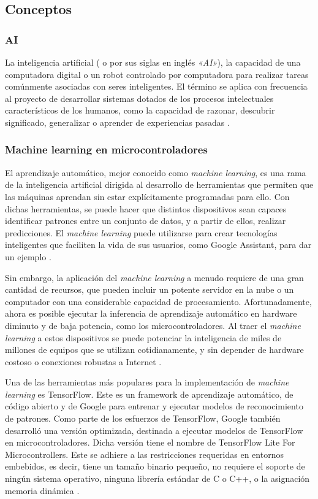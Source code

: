 \subsection{Conceptos}

\subsubsection{AI}

La inteligencia artificial ( o por sus siglas en inglés \textit{«AI»}), la capacidad de una computadora digital o un robot controlado por computadora para realizar tareas comúnmente asociadas con seres inteligentes. El término se aplica con frecuencia al proyecto de desarrollar sistemas dotados de los procesos intelectuales característicos de los humanos, como la capacidad de razonar, descubrir significado, generalizar o aprender de experiencias pasadas \cite{AI}.

\subsubsection{Machine learning en microcontroladores}

El aprendizaje automático, mejor conocido como \textit{machine learning}, es una rama de la inteligencia artificial dirigida al desarrollo de herramientas que permiten que las máquinas aprendan sin estar explícitamente programadas para ello. Con dichas herramientas, se puede hacer que distintos dispositivos sean capaces identificar patrones entre un conjunto de datos, y a partir de ellos, realizar predicciones. El \textit{machine learning} puede utilizarse para crear tecnologías inteligentes que faciliten la vida de sus usuarios, como Google Assistant, para dar un ejemplo \cite{mnatraj}.

Sin embargo, la aplicación del \textit{machine learning} a menudo requiere de una gran cantidad de recursos, que pueden incluir un potente servidor en la nube o un computador con una considerable capacidad de procesamiento. Afortunadamente, ahora es posible ejecutar la inferencia de aprendizaje automático en hardware diminuto y de baja potencia, como los microcontroladores. Al traer el \textit{machine learning} a estos dispositivos se puede potenciar la inteligencia de miles de millones de equipos que se utilizan cotidianamente, y sin depender de hardware costoso o conexiones robustas a Internet \cite{mnatraj}. 

Una de las herramientas más populares para la implementación de \textit{machine learning} es TensorFlow. Este es un framework de aprendizaje automático, de código abierto y de Google para entrenar y ejecutar modelos de reconocimiento de patrones. Como parte de los esfuerzos de TensorFlow, Google también desarrolló una versión optimizada, destinada a ejecutar modelos de TensorFlow en microcontroladores. Dicha versión tiene el nombre de TensorFlow Lite For Microcontrollers. Este se adhiere a las restricciones requeridas en entornos embebidos, es decir, tiene un tamaño binario pequeño, no requiere el soporte de ningún sistema operativo, ninguna librería estándar de C o C++, o la asignación memoria dinámica \cite{mnatraj}.

